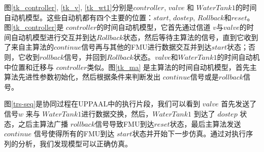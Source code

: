 \begin{figure}[htbp]
\end{figure}

图\ref{tk_controller}, \ref{tk_v}, \ref{tk_wt1}分别是$controller$, $valve$ 和 $WaterTank1$的时间自动机模型。这些自动机都有四个主要的位置：$start$, $dostep$, $Rollback$和$reset$。图\ref{tk_controller}是 $controller$的时间自动机模型，它首先通过信道 $v$与$valve$的时间自动机模型进行交互并到达$Rollback$状态，然后等待主算法的信号，直到它收到了来自主算法的$continue$信号再与其他的FMU进行数据交互并到达$start$状态；否则，它收到$rollback$信号，并回到$Rollback$状态。$valve$和$WaterTank1$的时间自动机中位置和迁移与 $controller$类似。图\ref{tk_ma} 是主算法的时间自动机模型，首先主算法先进性参数初始化，然后根据条件来判断发出  $continue$信号或是$rollback$信号。

图\ref{trs-seq}是协同过程在UPPAAL中的执行片段，我们可以看到 $valve$ 首先发送了信号$w$ 来与 $WaterTank1$进行数据交换，然后，$WaterTank1$ 到达了 $dostep$ 状态，之后主算法广播  $rollback$信号导致FMU到达$reset$状态，最后主算法发送$continue$ 信号使得所有的FMU到达 $start$状态并开始下一步仿真。通过对执行序列的分析，我们发现模型可以正确仿真。

